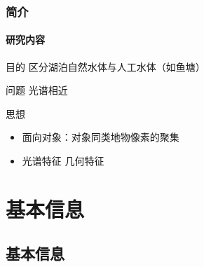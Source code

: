 \documentclass[10pt]{beamer}
\begin{document}
\begin{frame}
\frametitle{简介}
\framesubtitle{研究内容}
\begin{block}{目的}
区分湖泊自然水体与人工水体（如鱼塘）
\end{block}
\begin{block}{问题}
光谱相近
\end{block}
\begin{block}{思想}
\begin{itemize}
	\item 面向对象：对象\raisebox{0.1mm}{-----}同类地物像素的聚集
	\item 光谱特征 \raisebox{0.1mm}{+} 几何特征
\end{itemize}
\end{block}
\end{frame}


\section{基本信息}
\subsection{基本信息}

%	
\end{document}
